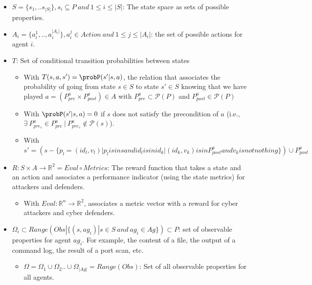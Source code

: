 \begin{itemize}
  \item $S = \{s_1, ..s_{|S|}\}, s_{i} \subseteq P \: and \: 1 \le i \le |S|$: The state space as sets of possible properties.

  \item $A_{i} = \{a_{i}^{1},..,a_{i}^{|A_{i}|}\}, a_{i}^j \in Action \: and \: 1 \le j \le |A_i|$: the set of possible actions for agent $i$.

  \item $T$: Set of conditional transition probabilities between states
        \begin{itemize}
          \item With $T(s,a,s') = \probP(s'|s,a)$, the relation that associates the probability of going from state $s \in S$ to state $s' \in S$ knowing that we have played $a = (P^a_{pre} \times P^a_{post}) \in A$ with $P^a_{pre} \subset \mathcal{P}(P)$ and $P^a_{post} \in \mathcal{P} (P)$
          \item With $\probP(s'|s,a) = 0$ if $s$ does not satisfy the precondition of $a$ (i.e., $\exists \: P_{pre_s}^{a} \in P_{pre}^{a} \: | \: P_{pre_s}^{a} \not\in \mathcal{P}(s)$).
          \item With $s' = (s - \{p_l= (id_l, v_l) | p_l is in s and id_l is in {id_k | (id_k, v_k) is in P^a_{post} and v_k is not nothing}\}) \cup P^a_{post}$
        \end{itemize}



  \item $R : S \times A \rightarrow \mathbb{R}^2 = Eval \circ Metrics$: The reward function that takes a state and an action and associates a performance indicator (using the state metrics) for attackers and defenders.
        \begin{itemize}
          \item With $Eval : \mathbb{R}^{n} \rightarrow \mathbb{R}^2$, associates a metric vector with a reward for cyber attackers and cyber defenders.
        \end{itemize}



  \item $\Omega_{i} \subset Range(Obs | \{ (s, ag_i) | s \in S \: and \: ag_i \in Ag \}) \subset P$: set of observable properties for agent $ag_i$. For example, the content of a file, the output of a command log, the result of a port scan, etc.
        \begin{itemize}
          \item $\Omega = \Omega_1 \cup \Omega_2 .. \cup \Omega_{|Ag|} = Range(Obs)$: Set of all observable properties for all agents.
        \end{itemize}


\end{itemize}
